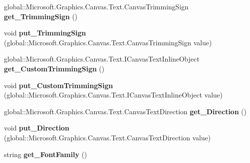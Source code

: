 \begin{DoxyCompactItemize}
global\+::\+Microsoft.\+Graphics.\+Canvas.\+Text.\+Canvas\+Trimming\+Sign {\bfseries get\+\_\+\+Trimming\+Sign} ()
\item 
\mbox{\label{interface_microsoft_1_1_graphics_1_1_canvas_1_1_text_1_1_i_canvas_text_format_ac8017ec2b958d4f84c22ffd8b24319e5}} 
void {\bfseries put\+\_\+\+Trimming\+Sign} (global\+::\+Microsoft.\+Graphics.\+Canvas.\+Text.\+Canvas\+Trimming\+Sign value)
\item 
\mbox{\label{interface_microsoft_1_1_graphics_1_1_canvas_1_1_text_1_1_i_canvas_text_format_a66d3e1355a4ce968e56b2239fdcd9fc5}} 
global\+::\+Microsoft.\+Graphics.\+Canvas.\+Text.\+I\+Canvas\+Text\+Inline\+Object {\bfseries get\+\_\+\+Custom\+Trimming\+Sign} ()
\item 
\mbox{\label{interface_microsoft_1_1_graphics_1_1_canvas_1_1_text_1_1_i_canvas_text_format_aefe2238d3d79706b8cfa6e70171a651c}} 
void {\bfseries put\+\_\+\+Custom\+Trimming\+Sign} (global\+::\+Microsoft.\+Graphics.\+Canvas.\+Text.\+I\+Canvas\+Text\+Inline\+Object value)
\item 
\mbox{\label{interface_microsoft_1_1_graphics_1_1_canvas_1_1_text_1_1_i_canvas_text_format_ad08083df7e2d44e9c7e2515e41680d6c}} 
global\+::\+Microsoft.\+Graphics.\+Canvas.\+Text.\+Canvas\+Text\+Direction {\bfseries get\+\_\+\+Direction} ()
\item 
\mbox{\label{interface_microsoft_1_1_graphics_1_1_canvas_1_1_text_1_1_i_canvas_text_format_ae3d774c44911dc8c0de1180ace93d9a4}} 
void {\bfseries put\+\_\+\+Direction} (global\+::\+Microsoft.\+Graphics.\+Canvas.\+Text.\+Canvas\+Text\+Direction value)
\item 
\mbox{\label{interface_microsoft_1_1_graphics_1_1_canvas_1_1_text_1_1_i_canvas_text_format_a8fe1529664d2dfc46f799ee6b186b187}} 
string {\bfseries get\+\_\+\+Font\+Family} ()
\item 

\end{DoxyCompactItemize}
